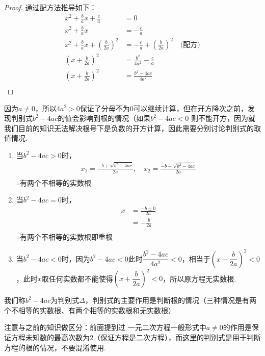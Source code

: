 \documentclass[lang=cn, 10pt, titlestyle=display, oneside, toc=twocol]{elegantbook}
\begin{document}
\begin{proof}
通过配方法推导如下：
\begin{align*}
    x^2 + \frac{b}{a}x + \frac{c}{a} &= 0\\
    x^2 + \frac{b}{a}x &= -\frac{c}{a}\\
    x^2 + \frac{b}{a}x + \left(\frac{b}{2a}\right)^2 &= -\frac{c}{a} + \left(\frac{b}{2a}\right)^2 \quad \text{(配方)} \\
    \left(x + \frac{b}{2a}\right)^2 &= \frac{b^2}{4a^2} - \frac{c}{a}\\
    \left(x + \frac{b}{2a}\right)^2 &= \frac{b^2 - 4ac}{4a^2}\\
\end{align*}
\end{proof}
因为\(a\ne0\)，所以\(4a^2>0\)保证了分母不为0可以继续计算，但在开方降次之前，发现判别式\(b^2 - 4ac\)的值会影响到根的情况（如果$b^2 - 4ac<0$ 则不能开方，因为就我们目前的知识无法解决根号下是负数的开方计算，因此需要分别讨论判别式的取值情况.
\begin{enumerate}
    \item 当\(b^2 - 4ac>0\)时，
    \begin{align*}
        x_1 = \frac{-b + \sqrt{b^2 - 4ac}}{2a}, \quad x_2 = \frac{-b - \sqrt{b^2 - 4ac}}{2a}\\
    \end{align*}
    $\therefore \text{有两个不相等的实数根}$
    \item 当\(b^2 - 4ac=0\)时，
    \begin{align*}
         x &= \frac{-b \pm 0}{2a}\\
    &= -\frac{b}{2a}\\
    \end{align*}
    $\therefore \text{有两个不相等的实数根即重根}$
    \item 当\(b^2 - 4ac<0\)时，因为\(b^2 - 4ac<0\)此时\(\dfrac{b^2 - 4ac}{4a^2}<0\)，相当于\((x + \dfrac{b}{2a})^2<0\)，此时\(x\)取任何实数都不能使得\((x + \dfrac{b}{2a})^2<0\)，所以原方程无实数根.

\end{enumerate}
\par
我们称\(b^2 - 4ac\)为判别式\(\Delta\)，判别式的主要作用是判断根的情况（三种情况是有两个不相等的实数根、有两个相等的实数根和无实数根）
\par
\begin{remark}
注意与之前的知识做区分：前面提到过 一元二次方程一般形式中\(a\ne0\)的作用是保证方程未知数的最高次数为2（保证方程是二次方程），而这里的判别式是用于判断方程的根的情况，不要混淆使用. 
\end{remark}
\end{document}
